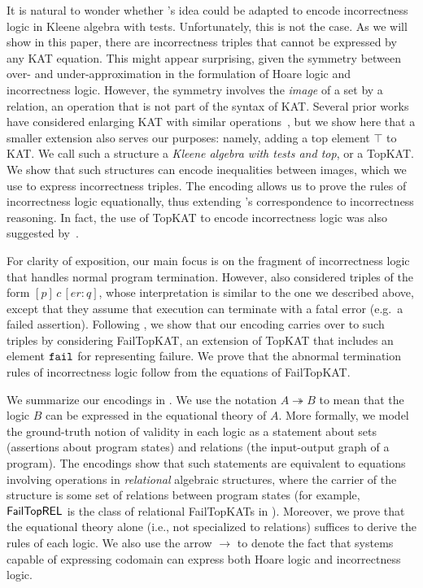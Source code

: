 It is natural to wonder whether \citeauthor{Kozen_2000}'s idea could be
adapted to encode incorrectness logic in Kleene algebra with tests.
Unfortunately, this is not the case. As we will show in this paper, there are
incorrectness triples that cannot be expressed by any KAT equation.  This might
appear surprising, given the symmetry between over- and under-approximation in
the formulation of Hoare logic and incorrectness logic.  However, the symmetry
involves the \emph{image} of a set by a relation, an operation that is not part
of the syntax of KAT\@.  Several prior works have considered enlarging KAT with
similar
operations~\cite{Desharnais_Möller_Struth_2004,Fahrenberg_Johansen_Struth_Ziemiánski_2021,Desharnais_Möller_Struth_2006},
but we show here that a smaller extension also serves our purposes: namely,
adding a top element \(\top\) to KAT\@.   We call such a structure a \emph{Kleene
  algebra with tests and top}, or a TopKAT\@.  We show that such structures can
encode inequalities between images, which we use to express incorrectness
triples.  The encoding allows us to prove the rules of incorrectness logic
equationally, thus extending \citeauthor{Kozen_2000}'s correspondence to
incorrectness reasoning. In fact, the use of TopKAT to encode incorrectness logic was also suggested by~\citet{OHearn_2020}.

For clarity of exposition, our main focus is on the fragment of incorrectness
logic that handles normal program termination.  However,
\citet{OHearn_2020} also considered triples of the form
\([p]\, c\, [er: q]\), whose interpretation is similar to the one we described
above, except that they assume that execution can terminate with a fatal error
(e.g.\ a failed assertion).  Following \citet{Mamouras_2017}, we show
that our encoding carries over to such triples by considering FailTopKAT, an
extension of TopKAT that includes an element \(\mathtt{fail}\) for representing failure.
We prove that the abnormal termination rules of incorrectness logic follow from
the equations of FailTopKAT\@.

We summarize our encodings in .  We
use the notation \(A ↠ B\) to mean that the logic \(B\) can be
expressed in the equational theory of \(A\).  More formally, we model the
ground-truth notion of validity in each logic as a statement about sets
(assertions about program states) and relations (the input-output graph of a
program).  The encodings show that such statements are equivalent to equations
involving operations in \emph{relational} algebraic structures, where the
carrier of the structure is some set of relations between program states (for
example, \(\mathsf{FailTopREL}\) is the class of relational FailTopKATs in
).  Moreover, we prove that the equational
theory alone (i.e., not specialized to relations) suffices to derive the rules
of each logic.  We also use the arrow \(\to\) to denote the fact that 
systems capable of expressing codomain can express both Hoare logic and incorrectness logic.


